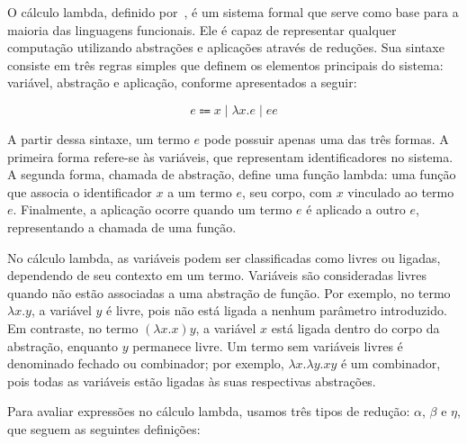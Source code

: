 



O cálculo lambda, definido por~, é um sistema formal que serve como base para a maioria das linguagens funcionais.
Ele é capaz de representar qualquer computação utilizando abstrações e aplicações através de reduções.
Sua sintaxe consiste em três regras simples que definem os elementos principais do sistema: variável, abstração e aplicação, conforme apresentados a seguir:

\begin{equation}\label{eq:lambda-calculus}
  e \Coloneqq x \mid \lambda x. e \mid e e
\end{equation}

A partir dessa sintaxe, um termo $e$ pode possuir apenas uma das três formas.
A primeira forma refere-se às variáveis, que representam identificadores no sistema.
A segunda forma, chamada de abstração, define uma função lambda: uma função que associa o identificador $x$ a um termo $e$, seu corpo, com $x$ vinculado ao termo $e$.
Finalmente, a aplicação ocorre quando um termo $e$ é aplicado a outro $e$, representando a chamada de uma função.

No cálculo lambda, as variáveis podem ser classificadas como livres ou ligadas, dependendo de seu contexto em um termo.
Variáveis são consideradas livres quando não estão associadas a uma abstração de função.
Por exemplo, no termo $\lambda x. y$, a variável $y$ é livre, pois não está ligada a nenhum parâmetro introduzido.
Em contraste, no termo $(\lambda x. x) y$, a variável $x$ está ligada dentro do corpo da abstração, enquanto $y$ permanece livre.
Um termo sem variáveis livres é denominado fechado ou combinador; por exemplo, $\lambda x. \lambda y. x y$ é um combinador, pois todas as variáveis estão ligadas às suas respectivas abstrações.

Para avaliar expressões no cálculo lambda, usamos três tipos de redução: $\alpha$, $\beta$ e $\eta$, que seguem as seguintes definições:

